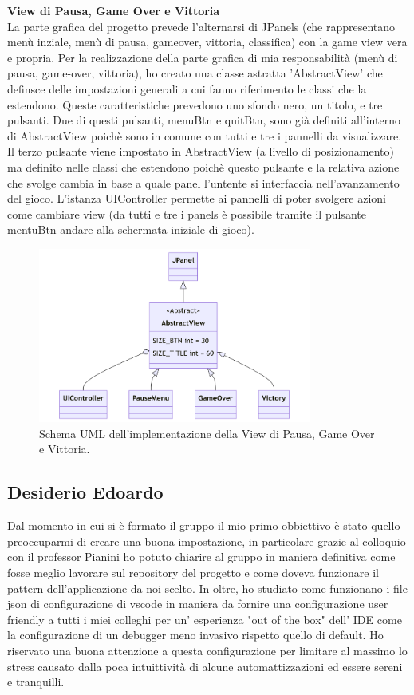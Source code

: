 \documentclass[a4paper,12pt]{report}
\begin{document}
\noindent
\textbf{View di Pausa, Game Over e Vittoria}\\
La parte grafica del progetto prevede l'alternarsi di JPanels (che rappresentano menù inziale, menù di pausa, gameover, vittoria, classifica)
con la game view vera e propria.
Per la realizzazione della parte grafica di mia responsabilità (menù di pausa, game-over, vittoria), ho creato una classe astratta 'AbstractView'
che definsce delle impostazioni generali a cui fanno riferimento le classi che la estendono.
Queste caratteristiche prevedono uno sfondo nero, un titolo, e tre pulsanti. Due di questi pulsanti, menuBtn e quitBtn,
sono già definiti all'interno di AbstractView poichè sono in comune con tutti e tre i pannelli da visualizzare.
Il terzo pulsante viene impostato in AbstractView (a livello di posizionamento) ma definito nelle classi che estendono poichè questo pulsante e la
relativa azione che svolge cambia in base a quale panel l'untente si interfaccia nell'avanzamento del gioco.
L'istanza UIController permette ai pannelli di poter svolgere azioni come cambiare view (da tutti e tre i panels è possibile tramite il pulsante
mentuBtn andare alla schermata iniziale di gioco).
\begin{figure}[H]
    \centering
    \includegraphics[width=0.8\textwidth]{images/AbstractView.png}
    \caption{Schema UML dell'implementazione della View di Pausa, Game Over e Vittoria.}
\end{figure}
\pagebreak
\subsection{Desiderio Edoardo}
Dal momento in cui si è formato il gruppo il mio primo obbiettivo è stato quello preoccuparmi di creare una buona impostazione,
in particolare grazie al colloquio con il professor Pianini ho potuto chiarire al gruppo in maniera definitiva come fosse meglio
lavorare sul repository del progetto e come doveva funzionare il pattern dell'applicazione da noi scelto.
In oltre, ho studiato come funzionano i file json di configurazione di vscode in maniera da fornire una configurazione user friendly
a tutti i miei colleghi per un' esperienza "out of the box" dell' IDE come la configurazione di un debugger meno invasivo rispetto quello di  default.
Ho riservato una buona attenzione a questa configurazione per limitare al massimo lo stress causato dalla poca intuittività di alcune
automattizzazioni ed essere sereni e tranquilli.
\end{document}

